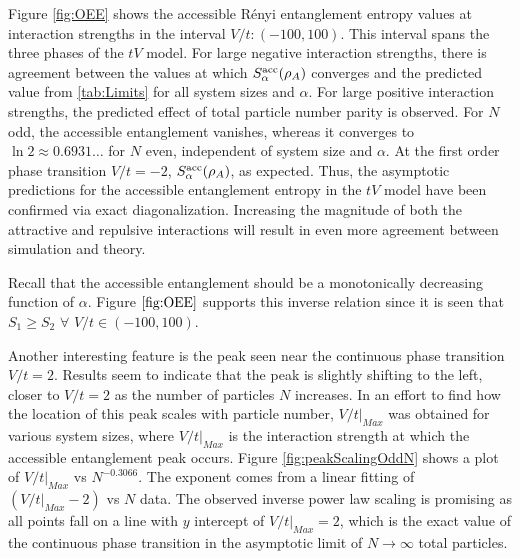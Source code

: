 Figure \ref{fig:OEE} shows the accessible R\'enyi entanglement entropy values at interaction strengths in the interval $V/t: \left( -100,100 \right)$. This interval spans the three phases of the $tV$ model. For large negative interaction strengths, there is agreement between the values at which $S_{\alpha}^{\rm acc}(\rho_A)$ converges and the predicted value from \ref{tab:Limits} for all system sizes and $\alpha$. For large positive interaction strengths, the predicted effect of total particle number parity is observed. For $N$ odd, the accessible entanglement vanishes, whereas it converges to $\ln{2} \approx 0.6931 \dots$ for $N$ even, independent of system size and $\alpha$. At the first order phase transition $V/t=-2$, $S_{\alpha}^{\rm acc}(\rho_A)$, as expected. Thus, the asymptotic predictions for the accessible entanglement entropy in the $tV$ model have been confirmed via exact diagonalization. Increasing the magnitude of both the attractive and repulsive interactions will result in even more agreement between simulation and theory.

Recall that the accessible entanglement should be a monotonically decreasing function of $\alpha$. Figure $\ref{fig:OEE}$ supports this inverse relation since it is seen that $S_{1} \geq S_{2}$ $\forall$ $V/t \in \left( -100,100 \right)$.

Another interesting feature is the peak seen near the continuous phase transition $V/t=2$. Results seem to indicate that the peak is slightly shifting to the left, closer to $V/t=2$ as the number of particles $N$ increases. In an effort to find how the location of this peak scales with particle number, $V/t\vert_{Max}$ was obtained for various system sizes, where $V/t\vert_{Max}$ is the interaction strength at which the accessible entanglement peak occurs. Figure \ref{fig:peakScalingOddN} shows a plot of $V/t\vert_{Max}$ vs $N^{-0.3066}$. The exponent comes from a linear fitting of $\left( V/t\vert_{Max} - 2 \right)$ vs $N$ data. The observed inverse power law scaling is promising as all points fall on a line with $y$ intercept of $V/t\vert_{Max} = 2$, which is the exact value of the continuous phase transition in the asymptotic limit of $N \to \infty$ total particles.


